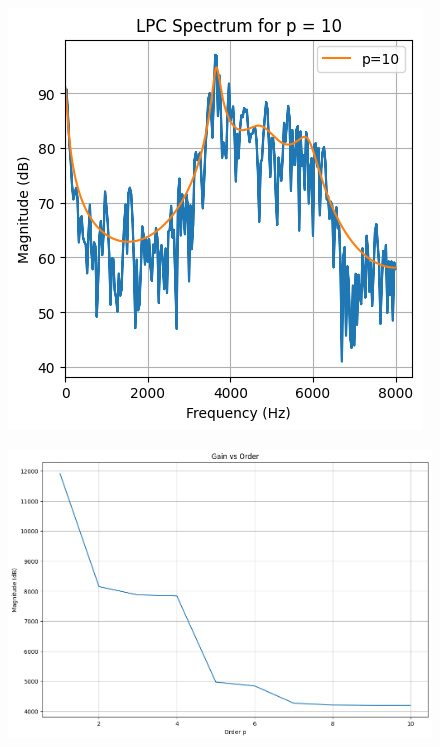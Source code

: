 \documentclass{article}
\begin{document}
\begin{figure}[H]
\begin{center}
\includegraphics[scale = 0.8]{10p2.png}
\end{center}
\end{figure}

\begin{figure}[H]
\begin{center}
\includegraphics[scale = 0.5]{gain2.png}
\end{center}
\end{figure}
\end{document}
